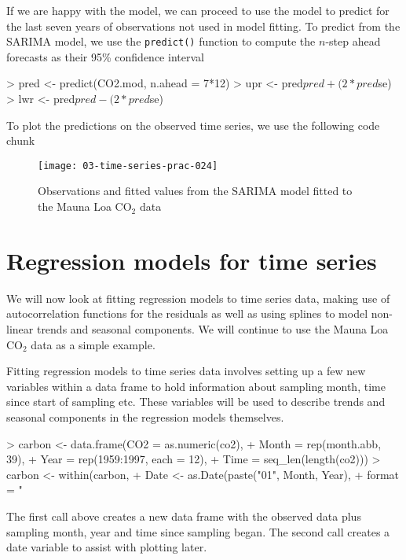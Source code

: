 \documentclass[a4paper,10pt]{article}
\begin{document}
If we are happy with the model, we can proceed to use the model to predict for the last seven years of observations not used in model fitting. To predict from the SARIMA model, we use the \texttt{predict()} function to compute the $n$-step ahead forecasts as their 95\% confidence interval
\begin{Schunk}
\begin{Sinput}
> pred <- predict(CO2.mod, n.ahead = 7*12)
> upr <- pred$pred + (2 * pred$se)
> lwr <- pred$pred - (2 * pred$se)
\end{Sinput}
\end{Schunk}
To plot the predictions on the observed time series, we use the following code chunk
\begin{Schunk}
\end{Schunk}

\begin{figure}[t]
\begin{center}
\texttt{[image: 03-time-series-prac-024]}
\caption{Observations and fitted values from the SARIMA model fitted to the Mauna Loa $\mathrm{CO_2}$ data}
\end{center}
\end{figure}

\section{Regression models for time series}
We will now look at fitting regression models to time series data, making use of autocorrelation functions for the residuals as well as using splines to model non-linear trends and seasonal components. We will continue to use the Mauna Loa $$ data as a simple example.

Fitting regression models to time series data involves setting up a few new variables within a data frame to hold information about sampling month, time since start of sampling etc. These variables will be used to describe trends and seasonal components in the regression models themselves.
\begin{Schunk}
\begin{Sinput}
> carbon <- data.frame(CO2 = as.numeric(co2),
+                      Month = rep(month.abb, 39),
+                      Year = rep(1959:1997, each = 12),
+                      Time = seq_len(length(co2)))
> carbon <- within(carbon,
+                  Date <- as.Date(paste("01", Month, Year),
+                                  format = "%d %b %Y"))
\end{Sinput}
\end{Schunk}
The first call above creates a new data frame with the observed data plus sampling month, year and time since sampling began. The second call creates a date variable to assist with plotting later.
\end{document}
